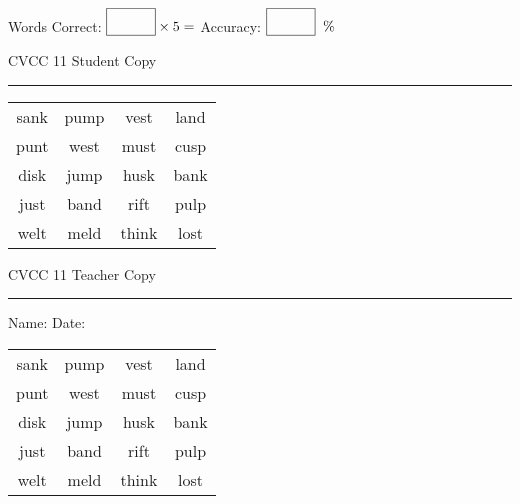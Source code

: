 \documentclass{memoir}
\begin{document}
\small

Words Correct: $\fbox{\phantom{\huge 100}} \times 5 = $ Accuracy: $\fbox{\phantom{\huge 100}}\;\; \%$ 

\vfill

\newpage


\footnotesize \noindent
CVCC 11 \hfill Student Copy
\smallskip
\hrule

\Large

\setlength{\tabcolsep}{14pt}
\def\arraystretch{3}

{\selectfont


\begin{vplace}[0.5]
\begin{center}
\begin{tabular}{cccc}
sank & pump & vest & land \\
punt & west & must & cusp \\
disk & jump & husk & bank \\
just & band & rift & pulp \\
welt & meld & think & lost \\
\end{tabular}
\end{center}
\end{vplace}

}

\newpage

\footnotesize \noindent
CVCC 11 \hfill Teacher Copy
\smallskip
\hrule

\small

\vfill

\noindent
Name: \underline{\hspace{1.75in}} \hfill Date: \underline{\hspace{1in}}

\Large

{\selectfont


\begin{vplace}[0.5]
\begin{center}
\begin{tabular}{cccc}
sank & pump & vest & land \\
punt & west & must & cusp \\
disk & jump & husk & bank \\
just & band & rift & pulp \\
welt & meld & think & lost \\
\end{tabular}
\end{center}
\end{vplace}



}
\end{document}
